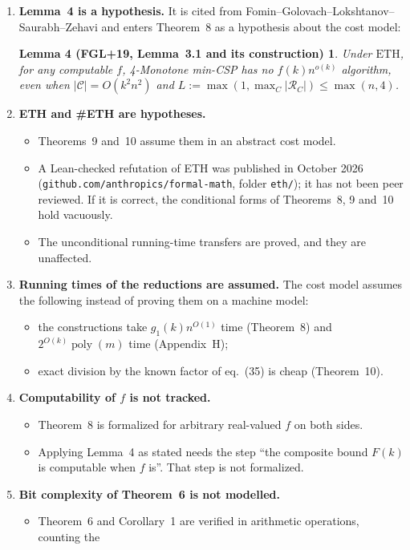 \documentclass[11pt]{article}
\newtheorem*{lemC}{Lemma 4 (FGL+19, Lemma~3.1 and its construction)}
\newcommand{\ETH}{\mathrm{ETH}}
\DeclareMathOperator{\poly}{poly}
\begin{document}
\begin{enumerate}[leftmargin=1.6em]
\item \textbf{Lemma~4 is a hypothesis.} It is cited from Fomin--Golovach--Lokshtanov--Saurabh--Zehavi
  and enters Theorem~8 as a hypothesis about the cost model:
  \begin{lemC}
  Under $\ETH$, for any computable $f$, 4-Monotone min-CSP has no $f(k)n^{o(k)}$ algorithm, even
  when $|\mathcal C|=O(k^2n^2)$ and $L:=\max(1,\max_C|\mathcal R_C|)\le\max(n,4)$.
  \end{lemC}
\item \textbf{ETH and \#ETH are hypotheses.}
  \begin{itemize}
    \item Theorems~9 and~10 assume them in an abstract cost model.
    \item A Lean-checked refutation of ETH was published in October 2026
      (\texttt{github.com/anthropics/formal-math}, folder \texttt{eth/}); it has not been peer
      reviewed. If it is correct, the conditional forms of Theorems~8, 9 and~10 hold
      vacuously.
    \item The unconditional running-time transfers are proved, and they are unaffected.
  \end{itemize}
\item \textbf{Running times of the reductions are assumed.} The cost model assumes the following
  instead of proving them on a machine model:
  \begin{itemize}
    \item the constructions take $g_1(k)n^{O(1)}$ time (Theorem~8) and $2^{O(k)}\poly(m)$ time
      (Appendix~H);
    \item exact division by the known factor of eq.~(35) is cheap (Theorem~10).
  \end{itemize}
\item \textbf{Computability of $f$ is not tracked.}
  \begin{itemize}
    \item Theorem~8 is formalized for arbitrary real-valued $f$ on both sides.
    \item Applying Lemma~4 as stated needs the step ``the composite bound $F(k)$ is computable
      when $f$ is''. That step is not formalized.
  \end{itemize}
\item \textbf{Bit complexity of Theorem~6 is not modelled.}
  \begin{itemize}
    \item Theorem~6 and Corollary~1 are verified in arithmetic operations, counting the

\end{itemize}
\end{enumerate}
\end{document}
